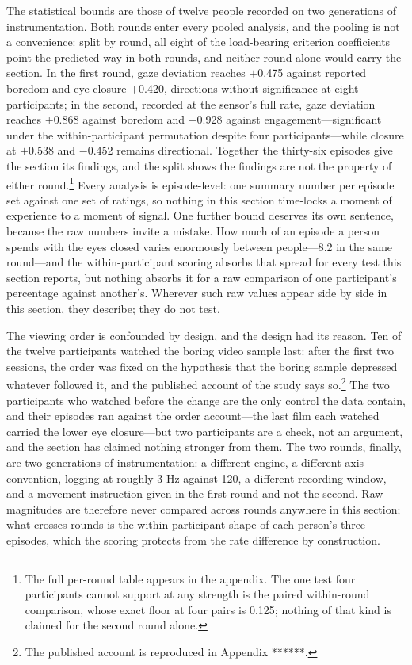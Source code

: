The statistical bounds are those of twelve people recorded on two generations of
instrumentation. Both rounds enter every pooled analysis, and the pooling is not a
convenience: split by round, all eight of the load-bearing criterion coefficients point the
predicted way in both rounds, and neither round alone would carry the section. In the first
round, gaze deviation reaches $+$0.475 against reported boredom and eye closure $+$0.420,
directions without significance at eight participants; in the second, recorded at the
sensor's full rate, gaze deviation reaches $+$0.868 against boredom and $-$0.928 against
engagement---significant under the within-participant permutation despite four
participants---while closure at $+$0.538 and $-$0.452 remains directional. Together the
thirty-six episodes give the section its findings, and the split shows the findings are not
the property of either round.\footnote{The full per-round table appears in the appendix. The
one test four participants cannot support at any strength is the paired within-round
comparison, whose exact floor at four pairs is 0.125; nothing of that kind is claimed for the
second round alone.} Every analysis is episode-level:
one summary number per episode set against one set of ratings, so nothing in this section
time-locks a moment of experience to a moment of signal. One further bound deserves its own
sentence, because the raw numbers invite a mistake. How much of an episode a person spends
with the eyes closed varies enormously between people---8.2%
in the same round---and the within-participant scoring absorbs that spread for every test
this section reports, but nothing absorbs it for a raw comparison of one participant's
percentage against another's. Wherever such raw values appear side by side in this section,
they describe; they do not test.

The viewing order is confounded by design, and the design had its reason. Ten of the twelve
participants watched the boring video sample last: after the first two sessions, the order
was fixed on the hypothesis that the boring sample depressed whatever followed it, and the
published account of the study says so.\footnote{The published account is reproduced in
Appendix ******.} The two participants who watched before the change are the only control
the data contain, and their episodes ran against the order account---the last film each
watched carried the lower eye closure---but two participants are a check, not an argument,
and the section has claimed nothing stronger from them. The two rounds, finally, are two
generations of instrumentation: a different engine, a different axis convention, logging at
roughly 3 Hz against 120, a different recording window, and a movement instruction given in
the first round and not the second. Raw magnitudes are therefore never compared across rounds
anywhere in this section; what crosses rounds is the within-participant shape of each
person's three episodes, which the scoring protects from the rate difference by construction.

